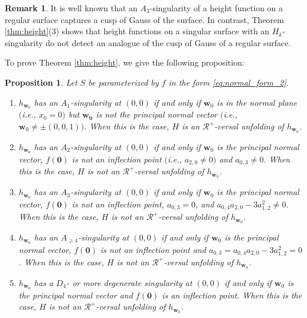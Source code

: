 \documentclass[12pt]{amsart}
\theoremstyle{plain}
\newtheorem{proposition}[theorem]{Proposition}
\theoremstyle{definition}
\newtheorem{remark}[theorem]{Remark}
\renewcommand{\geq}{\geqslant}
\begin{document}
\begin{remark}
It is well known that an $A_3$-singularity of a height function on a regular surface captures a cusp of Gauss of the surface.
In contrast, Theorem \ref{thm:height}(3) shows that height functions on a singular surface with an $H_k$-singularity do not detect an analogue of the cusp of Gauss of a regular surface.
\end{remark}

To prove Theorem \ref{thm:height}, we give the following proposition:

\begin{proposition}
\label{prop:height}
Let $S$ be parameterized by $f$ in the form \eqref{eq:normal_form_2}.
\begin{enumerate}
\item 
$h_{\bm{w}_0}$ has an $A_1$-singularity at $(0,0)$ if and only if $\bm{w}_0$ is in the normal plane $($i.e., $x_0 = 0)$ but $\bm{w_0}$ is not the principal normal vector $($i.e., $\bm{w}_0 \ne \pm(0,0,1))$.
When this is the case, $H$ is an $\mathcal{R}^+$-versal unfolding of $h_{\bm{w}_0}$. 

\item 
$h_{\bm{w}_0}$ has an $A_2$-singularity at $(0,0)$ if and only if $\bm{w}_0$ is the principal normal vector, $f(\bm{0})$ is not an inflection point $($i.e., $a_{2,0} \ne 0)$ and $a_{0,3} \ne 0$. 
When this is the case, $H$ is not an $\mathcal{R}^+$-versal unfolding of $h_{\bm{w}_0}$.

\item 
$h_{\bm{w}_0}$ has an $A_3$-singularity at $(0,0)$ if and only if $\bm{w}_0$ is the principal normal vector, $f(\bm{0})$ is not an inflection point, $a_{0,3} = 0$, and $a_{0,4} a_{2,0} - 3a_{1,2}^2 \ne 0$.
When this is the case, $H$ is not an $\mathcal{R}^+$-versal unfolding of $h_{\bm{w}_0}$.

\item 
$h_{\bm{w}_0}$ has an $A_{\geq 4}$-singularity at $(0,0)$ if and only if $\bm{w}_0$ is the principal normal vector, $f(\bm{0})$ is not an inflection point and $a_{0,3} = a_{0,4} a_{2,0} - 3 a_{1,2}^2 = 0$. 
When this is the case, $H$ is not an $\mathcal{R}^+$-versal unfolding of $h_{\bm{w}_0}$.

\item 
$h_{\bm{w}_0}$ has a $D_4$- or more degenerate singularity at $(0,0)$ if and only if $\bm{w}_0$ is the principal normal vector and $f(\bm{0})$ is an inflection point.
When this is the case, $H$ is not an $\mathcal{R}^+$-versal unfolding of $h_{\bm{w}_0}$.
\end{enumerate}
\end{proposition}
\end{document}
